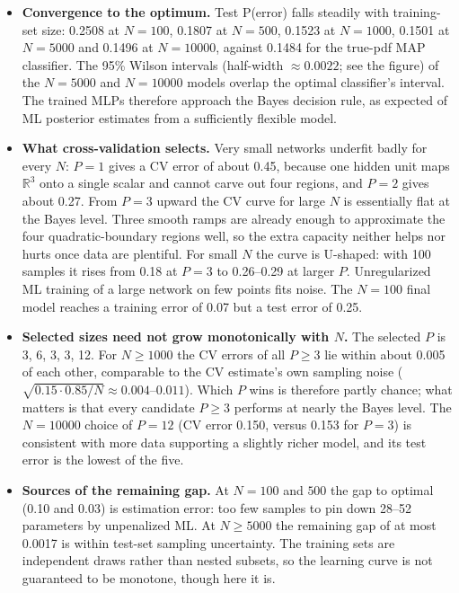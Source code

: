 \begin{itemize}
\item \textbf{Convergence to the optimum.} Test P(error) falls steadily with training-set size: 0.2508 at $N=100$, 0.1807 at $N=500$, 0.1523 at $N=1000$, 0.1501 at $N=5000$ and 0.1496 at $N=10000$, against 0.1484 for the true-pdf MAP classifier. The 95\% Wilson intervals (half-width $\approx0.0022$; see the figure) of the $N=5000$ and $N=10000$ models overlap the optimal classifier's interval. The trained MLPs therefore approach the Bayes decision rule, as expected of ML posterior estimates from a sufficiently flexible model.
\item \textbf{What cross-validation selects.} Very small networks underfit badly for every $N$: $P=1$ gives a CV error of about 0.45, because one hidden unit maps $\mathbb R^3$ onto a single scalar and cannot carve out four regions, and $P=2$ gives about 0.27. From $P=3$ upward the CV curve for large $N$ is essentially flat at the Bayes level. Three smooth ramps are already enough to approximate the four quadratic-boundary regions well, so the extra capacity neither helps nor hurts once data are plentiful. For small $N$ the curve is U-shaped: with 100 samples it rises from 0.18 at $P=3$ to 0.26--0.29 at larger $P$. Unregularized ML training of a large network on few points fits noise. The $N=100$ final model reaches a training error of 0.07 but a test error of 0.25.
\item \textbf{Selected sizes need not grow monotonically with $N$.} The selected $P$ is 3, 6, 3, 3, 12. For $N\ge1000$ the CV errors of all $P\ge3$ lie within about 0.005 of each other, comparable to the CV estimate's own sampling noise ($\sqrt{0.15\cdot0.85/N}\approx0.004$--$0.011$). Which $P$ wins is therefore partly chance; what matters is that every candidate $P\ge3$ performs at nearly the Bayes level. The $N=10000$ choice of $P=12$ (CV error 0.150, versus 0.153 for $P=3$) is consistent with more data supporting a slightly richer model, and its test error is the lowest of the five.
\item \textbf{Sources of the remaining gap.} At $N=100$ and $500$ the gap to optimal (0.10 and 0.03) is estimation error: too few samples to pin down 28--52 parameters by unpenalized ML. At $N\ge5000$ the remaining gap of at most 0.0017 is within test-set sampling uncertainty. The training sets are independent draws rather than nested subsets, so the learning curve is not guaranteed to be monotone, though here it is.
\end{itemize}
